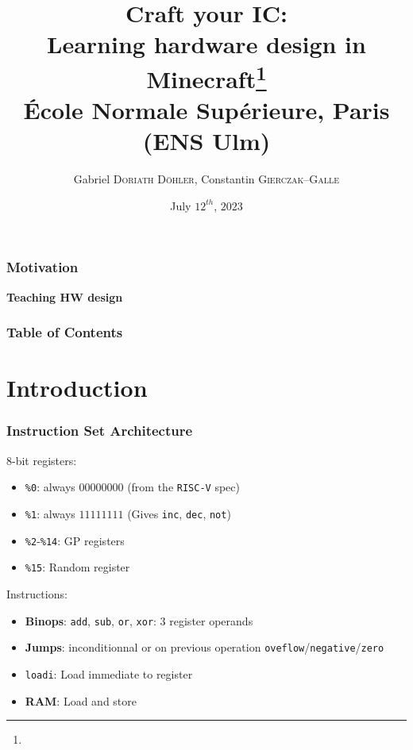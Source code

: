 \documentclass[aspectratio=169]{beamer}
\title{Craft your IC:\\Learning hardware design in
Minecraft\footnote{\tiny{}\reproduce}\\\small{} École Normale Supérieure, Paris (ENS Ulm)}
\author{Gabriel \textsc{Doriath Döhler}, Constantin \textsc{Gierczak--Galle}}
\date{July $12^{th}$, $2023$}
\newcommand{\rv}{\texttt{RISC-V}}
\newcommand{\vrv}{\texttt{V-\rv}}
\newcommand{\hw}{HW}
\begin{document}
\beamertemplatenavigationsymbolsempty
{}

\maketitle

\begin{frame}[fragile]
	\frametitle{Motivation}

	\textbf{Teaching \hw{} design}

\end{frame}

\begin{frame}[fragile]
	\frametitle{Table of Contents}
	\tableofcontents
\end{frame}

\section{Introduction}



\begin{frame}
	\frametitle{Instruction Set Architecture}

	$8$-bit registers:

	\begin{itemize}
		\item \texttt{\%0}: always $00000000$ (from the \rv{} spec)
		\item \texttt{\%1}: always $11111111$ (Gives \texttt{inc},
		      \texttt{dec}, \texttt{not})
		\item \texttt{\%2}-\texttt{\%14}: GP registers
		\item \texttt{\%15}: Random register
	\end{itemize}

	\pause

	Instructions:
	\begin{itemize}
		\item \textbf{Binops}: \texttt{add}, \texttt{sub}, \texttt{or},
		      \texttt{xor}: $3$ register operands
		\item \textbf{Jumps}: inconditionnal or on previous operation
		      \texttt{oveflow}/\texttt{negative}/\texttt{zero}
		\item \texttt{loadi}: Load immediate to register
		\item \textbf{RAM}: Load and store
	\end{itemize}
\end{frame}
\end{document}
